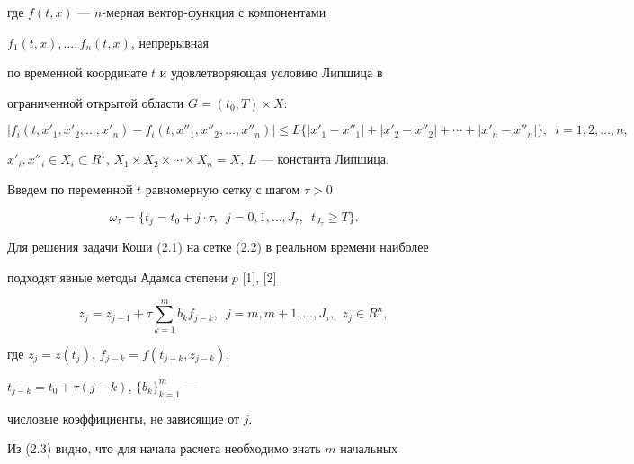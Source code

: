 где $f(t,x)$ --- $n$-мерная вектор-функция с компонентами 


$f_1(t,x),\dotsc,f_n(t,x)$, непрерывная 


по временной координате $t$ и удовлетворяющая условию Липшица в 


ограниченной открытой области $G=(t_0,T)\times X$: 


$$ 


|f_i(t,x'_1,x'_2,\dotsc,x'_n)-f_i(t,x''_1,x''_2,\dotsc,x''_n)|\le 


L\{|x'_1-x''_1|+|x'_2-x''_2|+\dotsb+|x'_n-x''_n|\}, 


\ \; i=1,2,\dotsc,n, 


$$ 


$x'_i,x''_i\in X_i\subset R^1$, $X_1\times X_2\times\dotsb\times 


X_n=X$, $L$ --- константа Липшица. 


 


Введем по переменной $t$ равномерную сетку с шагом $\tau>0$ 


\begin{equation} 


\omega_\tau=\{t_j=t_0+j\cdot\tau,\ \; j=0,1,\dotsc,J_\tau, 


\ \; t_{J_\tau}\ge T\}. 


\end{equation} 


 


Для решения задачи Коши (2.1) на сетке (2.2) в реальном времени наиболее 


подходят явные методы Адамса степени $p$ [1], [2] 


\begin{equation} 


z_j=z_{j-1}+\tau\sum^m_{k=1}b_k f_{j-k}, 


\ \; j=m,m+1,\dotsc,J_\tau,\ \; z_j\in R^n, 


\end{equation} 


где $z_j=z(t_j)$, $f_{j-k}=f(t_{j-k},z_{j-k})$, 


$t_{j-k}=t_0+\tau(j-k)$, $\{b_k\}^m_{k=1}$ --- 


числовые коэффициенты, не зависящие от $j$. 


 


Из (2.3) видно, что для начала расчета необходимо знать $m$ начальных 


